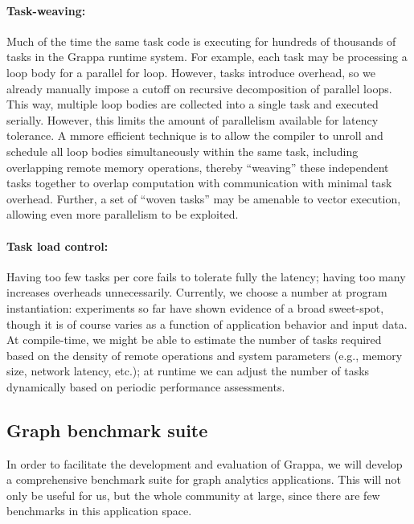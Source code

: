 \paragraph{Task-weaving: } Much of the time the same task code is executing for hundreds of thousands of tasks in the Grappa runtime system.  For example, each task may be processing a loop body for a parallel for loop.  However, tasks introduce overhead, so we already manually impose a cutoff on recursive decomposition of parallel loops.  This way, multiple loop bodies are collected into a single task and executed serially.  However, this limits the amount of parallelism available for latency tolerance. A mmore efficient technique is to allow the compiler to unroll and schedule all loop bodies simultaneously within the same task, including overlapping remote memory operations, thereby ``weaving'' these independent tasks together to overlap computation with communication with minimal task overhead.  Further, a set of ``woven tasks'' may be amenable to vector execution, allowing even more parallelism to be exploited.


\paragraph{Task load control:} Having too few tasks per core fails to tolerate
fully the latency; having too many increases overheads unnecessarily.
Currently, we choose a number at program instantiation: experiments so far
have shown evidence of a broad sweet-spot, though it is of course varies as a
function of application behavior and input data. At compile-time, we might be
able to estimate the number of tasks required based on the density of remote
operations and system parameters (e.g., memory size, network latency, etc.);
at runtime we can adjust the number of tasks dynamically based on periodic
performance assessments.


\subsection{Graph benchmark suite}

In order to facilitate the development and evaluation of Grappa, we will develop a comprehensive benchmark suite for graph analytics applications. This will not only be useful for us, but the whole community at large, since there are few benchmarks in this application space.


